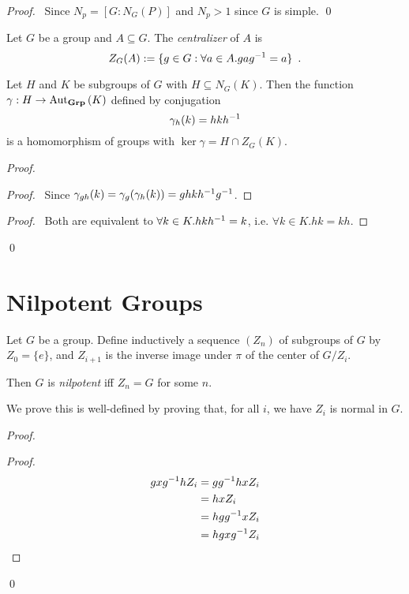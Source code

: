\begin{proof}
\pf\ Since $N_p = [G : N_G(P)]$ and $N_p > 1$ since $G$ is simple. \qed
\end{proof}

\begin{df}[Centralizer]
Let $G$ be a group and $A \subseteq G$. The \emph{centralizer} of $A$ is
\[ Z_G(A) := \{ g \in G : \forall a \in A. ga{g}^{-1} = a \} \enspace . \]
\end{df}


\begin{prop}
Let $H$ and $K$ be subgroups of $G$ with $H \subseteq N_G(K)$. Then the function $\gamma : H \rightarrow \mathrm{Aut}_{\mathbf{Grp}} \left( {K} \right)$ defined by conjugation
\[ \gamma_h(k) = hk{h}^{-1} \]
is a homomorphism of groups with $\ker \gamma = H \cap Z_G(K)$.
\end{prop}

\begin{proof}
\pf
{}
\begin{proof}
	\pf\ Since $\gamma_{gh}(k) = \gamma_g(\gamma_h(k)) = ghk{h}^{-1}{g}^{-1}$.
\end{proof}
\begin{proof}
	\pf\ Both are equivalent to $\forall k \in K. hk{h}^{-1} = k$, i.e. $\forall k \in K. hk = kh$.
\end{proof}
\qed
\end{proof}

\section{Nilpotent Groups}

\begin{df}[Nilpotent]
Let $G$ be a group. Define inductively a sequence $(Z_n)$ of subgroups of $G$ by $Z_0 = \{e\}$, and $Z_{i+1}$ is the inverse image under $\pi$ of the center of $G / Z_i$.

Then $G$ is \emph{nilpotent} iff $Z_n = G$ for some $n$.

We prove this is well-defined by proving that, for all $i$, we have $Z_i$ is normal in $G$.
\end{df}

\begin{proof}
\pf
{}
\begin{proof}
	\pf
	\begin{align*}
		gx{g}^{-1}hZ_i & = g{g}^{-1}hxZ_i \\
		& = hxZ_i \\
		& = hg{g}^{-1}xZ_i \\
		& = hgx{g}^{-1}Z_i
	\end{align*}
\end{proof}
\qed
\end{proof}

